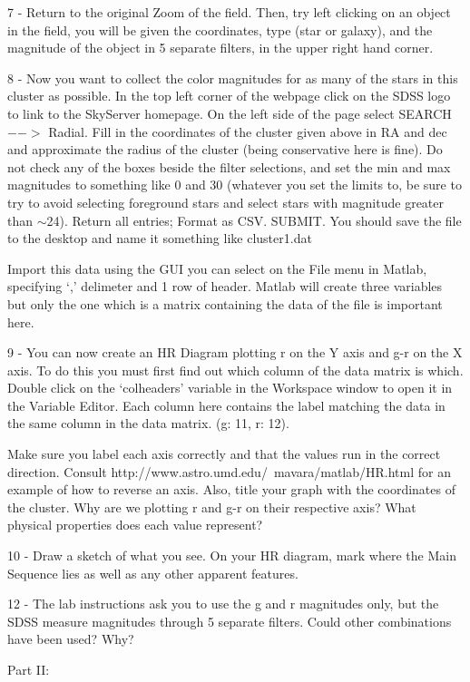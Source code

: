 \documentclass[11pt]{article}
\begin{document}
7 - Return to the original Zoom of the field.  Then, try left clicking
on an object in the field, you will be given the coordinates, type
(star or galaxy), and the magnitude of the object in 5 separate
filters, in the upper right hand corner.

8 - Now you want to collect the color magnitudes for as many of the stars in this cluster as possible. In the top left corner of the webpage click on the SDSS logo to link to the SkyServer homepage. On the left side of the page select SEARCH $-->$ Radial. Fill in the coordinates of the cluster given above in RA and dec and approximate the radius of the cluster (being conservative here is fine). Do not check any of the boxes beside the filter selections, and set the min and max magnitudes to something like 0 and 30 (whatever you set the limits to, be sure to try to avoid selecting foreground stars and select stars with magnitude greater than $\sim$24). Return all entries; Format as CSV. SUBMIT. You should save the file to the desktop and name it something like cluster1.dat

Import this data using the GUI you can select on the File menu in Matlab, specifying `,' delimeter and 1 row of header. Matlab will create three variables but only the one which is a matrix containing the data of the file is important here.

9 - You can now create an HR Diagram plotting r on the Y axis and g-r on the X axis. To do this you must first find out which column of the data matrix is which. Double click on the `colheaders' variable in the Workspace window to open it in the Variable Editor. Each column here contains the label matching the data in the same column in the data matrix. (g: 11, r: 12).

Make sure you label each axis correctly and that the values run in the
correct direction. Consult http://www.astro.umd.edu/~mavara/matlab/HR.html for an example of how to reverse an axis. Also, title your graph with the coordinates of
the cluster.  Why are we plotting r and g-r on their respective axis?
What physical properties does each value represent?

10 - Draw a sketch of what you see. On your HR diagram, mark where the Main Sequence lies as well as any other apparent features.

12 - The lab instructions ask you to use the g and r magnitudes only,
but the SDSS measure magnitudes through 5 separate filters.  Could
other combinations have been used?  Why?

Part II:\\  
\end{document}
